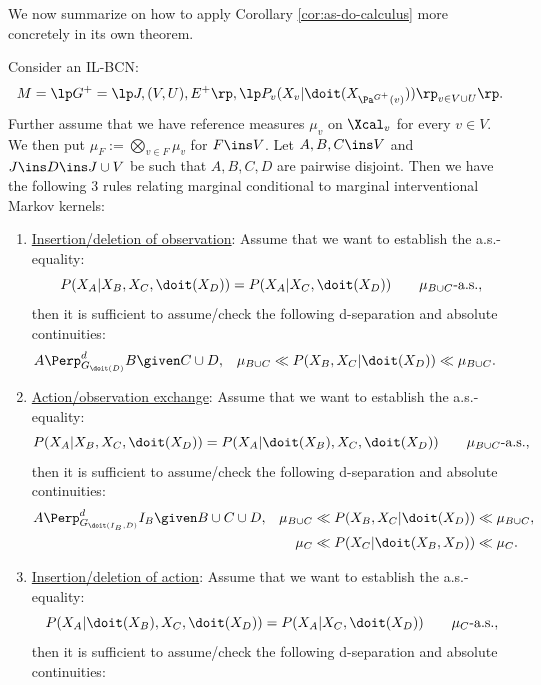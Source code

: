 We now summarize on how to apply Corollary \ref{cor:as-do-calculus} more concretely in its own theorem.

\begin{Thm}
    \label{thm:as-do-calculus}
        Consider an IL-BCN:
    \[M= \lp G^+=\lp J,(V,U),E^+ \rp, \lp P_v ( X_v|\doit( X_{\Pa^{G^+}(v)})) \rp_{v \in V \cup U} \rp.\]
        Further assume that we have reference measures $\mu_v$ on $\Xcal_v$ for every $v \in V$. 
    We then put $\mu_F := \bigotimes_{v \in F} \mu_v$ for $F \ins V$.
    Let $A,B,C \ins V$ and $J \ins D \ins J \cup V$ be such that $A,B,C,D$ are pairwise disjoint.
    Then we have the following 3 rules relating marginal conditional to marginal interventional Markov kernels:
    \begin{enumerate}
        \item \underline{Insertion/deletion of observation}:
            Assume that we want to establish the a.s.-equality:
            \[ P(X_A|X_B,X_C,\doit(X_{D})) = P(X_A|X_C,\doit(X_{D})) \qquad \mu_{B \cup C}\text{-a.s.}, \]
         then it is sufficient to assume/check the following d-separation and absolute continuities:
         \begin{align*} 
             A &\Perp^d_{G_{\doit(D)}} B \given C \cup D, &
             \mu_{B \cup C} &\ll P(X_B,X_C|\doit(X_{D}))\ll \mu_{B \cup C}.
         \end{align*}
     \item \underline{Action/observation exchange}: 
         Assume that we want to establish the a.s.-equality:
         \[ P(X_A|X_B,X_C,\doit(X_{D}))  = P(X_A|\doit(X_B),X_C,\doit(X_{D})) 
         \qquad \mu_{B \cup C}\text{-a.s.}, \]
         then it is sufficient to assume/check the following d-separation and absolute continuities:
         \begin{align*} 
             A & \Perp^d_{G_{\doit(I_B,D)}} I_B \given B \cup C \cup D, &          
                    \mu_{B \cup C} &\ll  P(X_B,X_C|\doit(X_{D})) \ll \mu_{B \cup C},\\
                 &&   \mu_C &\ll  P(X_C|\doit(X_B,X_{D})) \ll \mu_C.
         \end{align*}
     \item \underline{Insertion/deletion of action}: 
         Assume that we want to establish the a.s.-equality:
         \[ P(X_A|\doit(X_B),X_C,\doit(X_{D})) = P(X_A|X_C,\doit(X_{D})) \qquad \mu_C\text{-a.s.}, \]
          then it is sufficient to assume/check the following d-separation and absolute continuities:

\end{enumerate}
\end{Thm}
